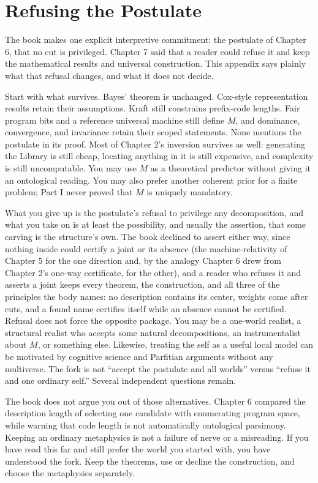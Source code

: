 \chapter{Refusing the Postulate}\label{app:refusing}

The book makes one explicit interpretive commitment: the postulate of Chapter 6, that no cut is privileged. Chapter 7 said that a reader could refuse it and keep the mathematical results and universal construction. This appendix says plainly what that refusal changes, and what it does not decide.

Start with what survives. Bayes' theorem is unchanged. Cox-style representation results retain their assumptions. Kraft still constrains prefix-code lengths. Fair program bits and a reference universal machine still define $M$, and dominance, convergence, and invariance retain their scoped statements. None mentions the postulate in its proof. Most of Chapter 2's inversion survives as well: generating the Library is still cheap, locating anything in it is still expensive, and complexity is still uncomputable. You may use $M$ as a theoretical predictor without giving it an ontological reading. You may also prefer another coherent prior for a finite problem; Part I never proved that $M$ is uniquely mandatory.

What you give up is the postulate's refusal to privilege any decomposition, and what you take on is at least the possibility, and usually the assertion, that some carving is the structure's own. The book declined to assert either way, since nothing inside could certify a joint or its absence (the machine-relativity of Chapter 5 for the one direction and, by the analogy Chapter 6 drew from Chapter 2's one-way certificate, for the other), and a reader who refuses it and asserts a joint keeps every theorem, the construction, and all three of the principles the body names: no description contains its center, weights come after cuts, and a found name certifies itself while an absence cannot be certified. Refusal does not force the opposite package. You may be a one-world realist, a structural realist who accepts some natural decompositions, an instrumentalist about $M$, or something else. Likewise, treating the self as a useful local model can be motivated by cognitive science and Parfitian arguments without any multiverse. The fork is not ``accept the postulate and all worlds'' versus ``refuse it and one ordinary self.'' Several independent questions remain.

The book does not argue you out of those alternatives. Chapter 6 compared the description length of selecting one candidate with enumerating program space, while warning that code length is not automatically ontological parsimony. Keeping an ordinary metaphysics is not a failure of nerve or a misreading. If you have read this far and still prefer the world you started with, you have understood the fork. Keep the theorems, use or decline the construction, and choose the metaphysics separately.
